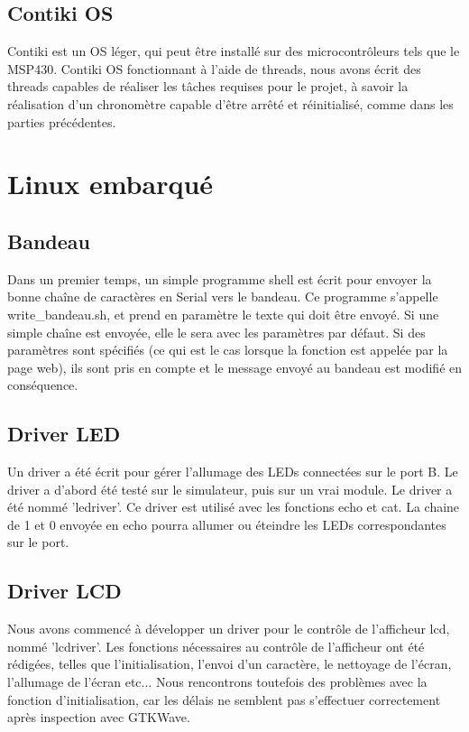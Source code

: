 \documentclass[a4paper,12pt]{article}
\begin{document}
\bigskip
  \subsection{Contiki OS}
  	Contiki est un OS léger, qui peut être installé sur des microcontrôleurs tels que le MSP430. Contiki OS fonctionnant à l'aide de threads, nous avons écrit des threads capables de réaliser les tâches requises pour le projet, à savoir la réalisation d'un chronomètre capable d'être arrêté et réinitialisé, comme dans les parties précédentes.


\newpage
\section{Linux embarqué}
  
  \subsection{Bandeau}
  	Dans un premier temps, un simple programme shell est écrit pour envoyer la bonne chaîne de caractères en Serial vers le bandeau. Ce programme s'appelle write\_bandeau.sh, et prend en paramètre le texte qui doit être envoyé. Si une simple chaîne est envoyée, elle le sera avec les paramètres par défaut. Si des paramètres sont spécifiés (ce qui est le cas lorsque la fonction est appelée par la page web), ils sont pris en compte et le message envoyé au bandeau est modifié en conséquence.

\bigskip
  \subsection{Driver LED}
  	Un driver a été écrit pour gérer l'allumage des LEDs connectées sur le port B. Le driver a d'abord été testé sur le simulateur, puis sur un vrai module. Le driver a été nommé 'ledriver'. Ce driver est utilisé avec les fonctions echo et cat. La chaine de 1 et 0 envoyée en echo pourra allumer ou éteindre les LEDs correspondantes sur le port.

\bigskip
  \subsection{Driver LCD}
  	Nous avons commencé à développer un driver pour le contrôle de l'afficheur lcd, nommé 'lcdriver'. Les fonctions nécessaires au contrôle de l'afficheur ont été rédigées, telles que l'initialisation, l'envoi d'un caractère, le nettoyage de l'écran, l'allumage de l'écran etc... Nous rencontrons toutefois des problèmes avec la fonction d'initialisation, car les délais ne semblent pas s'effectuer correctement après inspection avec GTKWave.
\end{document}
